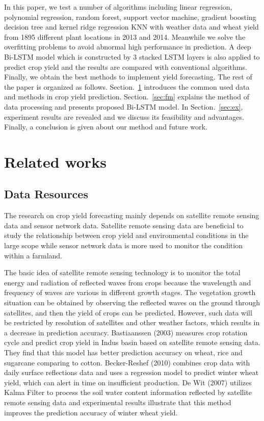 \documentclass[conference]{IEEEtran}
\begin{document}
  In this paper, we test a number of algorithms including linear regression, polynomial regression, random forest, support vector machine, gradient boosting decision tree and kernel ridge regression KNN with weather data and wheat yield from 1895 different plant locations in 2013 and 2014. Meanwhile we solve the overﬁtting problems to avoid abnormal high performance in prediction. A deep Bi-LSTM model which is constructed by 3 stacked LSTM layers is also applied to predict crop yield and the results are compared with conventional algorithms. Finally, we obtain the best methods to implement yield forecasting. The rest of the paper is organized as follows. Section.~\ref{sec:RW} introduces the common used data and methods in crop yield prediction. Section.~\ref{sec:fm} explains the method of data processing and presents proposed Bi-LSTM model. In Section.~\ref{sec:ex}, experiment results are revealed and we discuss its feasibility and advantages. Finally, a conclusion is given about our method and future work.

\section{Related works} \label{sec:RW}

  \subsection{Data Resources}

    The research on crop yield forecasting mainly depends on satellite remote sensing data and sensor network data. Satellite remote sensing data are beneficial to study the relationship between crop yield and environmental conditions in the large scope while sensor network data is more used to monitor the condition within a farmland. 

    The basic idea of satellite remote sensing technology is to monitor the total energy and radiation of reflected waves from crops because the wavelength and frequency of waves are various in different growth stages. The vegetation growth situation can be obtained by observing the reﬂected waves on the ground through satellites, and then the yield of crops can be predicted. However, such data will be restricted by resolution of satellites and other weather factors, which results in a decrease in prediction accuracy. Bastiaanssen (2003) \cite{Bastiaanssen2003} measures crop rotation cycle and predict crop yield in Indus basin based on satellite remote sensing data. They ﬁnd that this model has better prediction accuracy on wheat, rice and sugarcane comparing to cotton. Becker-Reshef (2010)\cite{Becker-Reshef2010} combines crop data with daily surface reﬂections data and uses a regression model to predict winter wheat yield, which can alert in time on insufficient production. De Wit (2007) \cite{DeWit2007} utilizes Kalma Filter to process the soil water content information reﬂected by satellite remote sensing data and experimental results illustrate that this method improves the prediction accuracy of winter wheat yield.
\end{document}
